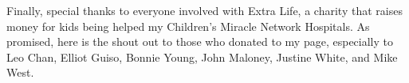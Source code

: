 \documentclass[pdflatex,final]{pittetd}%
\begin{document}
Finally, special thanks to everyone involved with Extra Life, a charity that raises money for kids being helped my Children's Miracle Network Hospitals. As promised, here is the shout out to those who donated to my page, especially to Leo Chan, Elliot Guiso, Bonnie Young, John Maloney, Justine White, and Mike West.

%












%
\appendix


%
%
\end{document}
